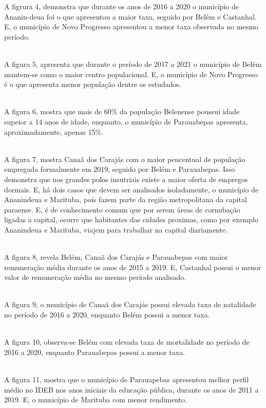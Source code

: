 \documentclass[a4paper, 10pt]{article}
\begin{document}
A figrura 4, demonstra que durante os anos de 2016 a 2020 o município de Ananin-deua foi o que apresentou a maior taxa, seguido por Belém e Castanhal. E, o município de Novo Progresso apresentou a menor taxa observada no mesmo período.

\\

A figura 5, apresenta que durante o período de 2017 a 2021 o município de Belém mantem-se como o maior centro populacional. E, o município de Novo Progresso é o que apresenta menor população dentre os estudados.

\\

A figura 6, mostra que mais de 60\% da população Belenense poussui idade supeior a 14 anos de idade, enquanto, o município de Parauabepas apresenta, aproximadamente, apenas 15\%.

\\

A figura 7, mostra Canaã dos Carajás com o maior pencentual de população empregada formalmente em 2019, seguido por Belém e Parauabepas. Isso demonstra que nos grandes polos insutriais existe a maior oferta de empregos dormais. E, há dois casos que devem ser analisados isoladamente, o município de Ananindeua e Marituba, pois fazem parte da região metropolitana da capital paraense. E, é de conhecimento comum que por serem áreas de cornubação ligadas a capital, ocorre que habitantes das cidades proximas, como por exemplo Ananindeua e Marituba, viajem para trabalhar na capital diariamente.

\\

A figura 8, revela Belém, Canaã dos Carajás e Parauabepas com maior remuneração média durante os anos de 2015 a 2019. E, Castanhal possui o menor valor de remuneração média no mesmo período analisado. 

\\

A figura 9, o município de Canaã dos Carajás possui elevada taxa de natalidade no período de 2016 a 2020, enquanto Belém possui a menor taxa.

\\

A figura 10, observa-se Belém com elevada taxa de mortalidade no período de 2016 a 2020, enquanto Parauabepas possui a menor taxa.

\\

A figura 11, mostra que o município de Parauapebas apresentou melhor perfil médio no IDEB nos anos iniciais da educação pública, durante os anos de 2011 a 2019. E, o município de Marituba com menor rendimento.
\end{document}
